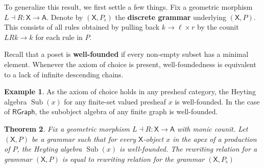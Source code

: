 \documentclass{amsart}
\newcommand{\A}{\cat{A}}
\newcommand{\X}{\cat{X}}
\newcommand{\RGraph}{\cat{RGraph}}
\newcommand{\defn}[1]{\textbf{#1}}
\newcommand{\cat}[1]{\mathsf{#1}}
\newcommand{\from}{\colon}
\DeclareMathOperator{\Sub}{Sub}
\newtheorem{theorem}{Theorem}[section]
\theoremstyle{remark}
\theoremstyle{definition}
\newtheorem{example}[theorem]{Example}
\begin{document}
To generalize this result, we first settle a few things.
Fix a geometric morphism $ L \dashv R \from \X \to \A
$. Denote by $ ( \X , P_\flat ) $ the \defn{discrete
  grammar} underlying $ ( \X , P ) $. This consists of all
rules obtained by pulling back $ k \to \ell \times r $ by
the counit $ LRk \to k $ for each rule in $ P $.

Recall that a poset is \textbf{well-founded} if every
non-empty subset has a minimal element.  Whenever the axiom
of choice is present, well-foundedness is equivalent to a
lack of infinite descending chains.

\begin{example}
  As the axiom of choice holds in any presheaf category, the
  Heyting algebra $ \Sub ( x ) $ for any finite-set valued
  presheaf $ x $ is well-founded. In the case of
  $ \RGraph $, the subobject algebra of any finite graph is
  well-founded.
\end{example}

\begin{theorem}
\label{thm:production-same-rewrite-relation-as-discrete}
Fix a geometric morphism $ L \dashv R \from \X \to \A $ with
monic counit. Let $ ( \X , P ) $ be a grammar such that for
every $ \X $-object $ x $ in the apex of a production of
$ P $, the Heyting algebra $ \Sub (x) $ is well-founded.
The rewriting relation for a grammar $ ( \X , P ) $ is equal
to rewriting relation for the grammar $ ( \X , P_{\flat} ) $
\end{theorem}
\end{document}

